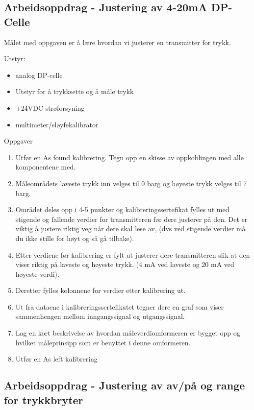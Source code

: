 \subsection{Arbeidsoppdrag - Justering av 4-20mA DP-Celle}

Målet med oppgaven er å lære hvordan vi justerer en transmitter for trykk.


Utstyr:
\begin{itemize}[noitemsep]
	\item analog DP-celle 
	\item Utstyr for å trykksette og å måle trykk 
	\item +24VDC strøforsyning 
	\item multimeter/sløyfekalibrator
\end{itemize}

Oppgaver \begin{enumerate}
	\item Utfør en As found kalibrering. Tegn opp en skisse av oppkoblingen med alle komponentene med.
	\item Måleområdets laveste trykk inn velges til 0 barg og høyeste trykk velges til 7 barg.
	\item Området deles opp i 4-5 punkter og kalibreringssertefikat fylles ut med stigende og fallende verdier for transmitteren før dere justerer på den. Det er viktig å justere riktig veg når dere skal lese av, (dvs ved stigende verdier må du ikke stille for høyt og så gå tilbake). 
	\item Etter verdiene før kalibrering er fylt ut justerer dere transmitteren slik at den viser riktig på laveste og høyeste trykk. (4 mA ved laveste og 20 mA ved høyeste verdi).
	\item Deretter fylles kolonnene for verdier etter kalibrering ut.
	\item Ut fra dataene i kalibreringssertefikatet tegner dere en graf som viser sammenhengen mellom inngangssignal og utgangssignal.
	\item Lag en kort beskrivelse av hvordan måleverdiomformeren er bygget opp og hvilket måleprinsipp som er benyttet i denne omformeren.
	\item Utfør en As left kalibrering 
\end{enumerate}



\subsection{Arbeidsoppdrag - Justering av av/på og range for trykkbryter}

